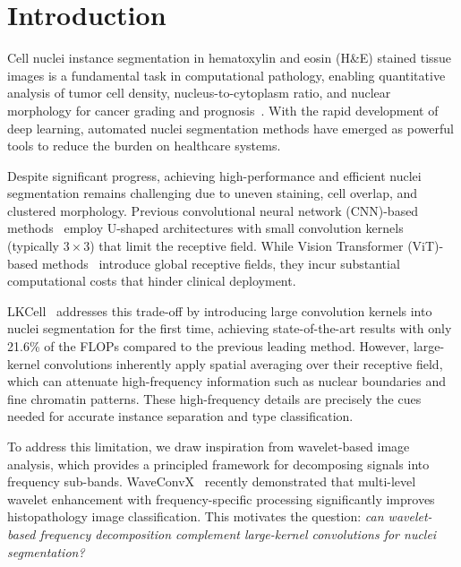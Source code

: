 \documentclass[conference]{IEEEtran}
\begin{document}
\section{Introduction}
\label{sec:intro}

Cell nuclei instance segmentation in hematoxylin and eosin (H\&E) stained tissue images is a fundamental task in computational pathology, enabling quantitative analysis of tumor cell density, nucleus-to-cytoplasm ratio, and nuclear morphology for cancer grading and prognosis~\cite{lkcell}. With the rapid development of deep learning, automated nuclei segmentation methods have emerged as powerful tools to reduce the burden on healthcare systems.

Despite significant progress, achieving high-performance and efficient nuclei segmentation remains challenging due to uneven staining, cell overlap, and clustered morphology. Previous convolutional neural network (CNN)-based methods~\cite{hoevernet, stardist, micro_net} employ U-shaped architectures with small convolution kernels (typically $3{\times}3$) that limit the receptive field. While Vision Transformer (ViT)-based methods~\cite{cellvit, swin_unet} introduce global receptive fields, they incur substantial computational costs that hinder clinical deployment.

LKCell~\cite{lkcell} addresses this trade-off by introducing large convolution kernels into nuclei segmentation for the first time, achieving state-of-the-art results with only 21.6\% of the FLOPs compared to the previous leading method. However, large-kernel convolutions inherently apply spatial averaging over their receptive field, which can attenuate high-frequency information such as nuclear boundaries and fine chromatin patterns. These high-frequency details are precisely the cues needed for accurate instance separation and type classification.

To address this limitation, we draw inspiration from wavelet-based image analysis, which provides a principled framework for decomposing signals into frequency sub-bands. WaveConvX~\cite{waveconvx} recently demonstrated that multi-level wavelet enhancement with frequency-specific processing significantly improves histopathology image classification. This motivates the question: \emph{can wavelet-based frequency decomposition complement large-kernel convolutions for nuclei segmentation?}
\end{document}
